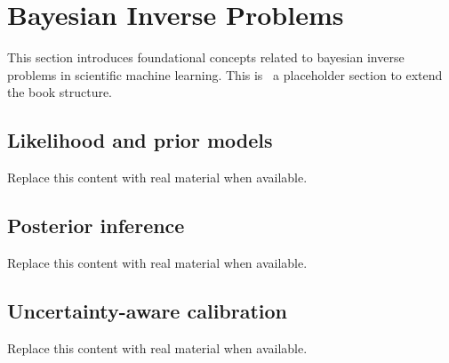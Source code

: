 \section{Bayesian Inverse Problems}
This section introduces foundational concepts related to bayesian inverse problems in scientific machine learning. This is~\cite{abdulmaksoudTransformerBasedSensorFusion2025} a placeholder section to extend the book structure.

\subsection{Likelihood and prior models}
Replace this content with real material when available.

\subsection{Posterior inference}
Replace this content with real material when available.

\subsection{Uncertainty-aware calibration}
Replace this content with real material when available.
